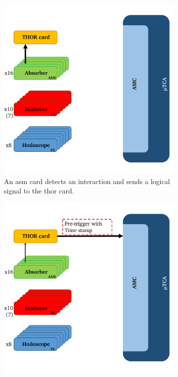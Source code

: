 \begin{figure}
\begin{subfigure}[t]{0.5\textwidth}
 \centering
\includegraphics[width=0.9\linewidth]{03_GraphicFiles/appendixA_dataFormat/triggerLogic_1.pdf}
\caption[Signal detection on one \gls{asm} card and logical signal sent to the \gls{thor} card.]{An \gls{asm} card detects an interaction and sends a logical signal to the \gls{thor} card.}
\label{chapappA::subfig::triggerLogic_1}
\end{subfigure}%
\begin{subfigure}[t]{0.5\textwidth}
 \centering
\includegraphics[width=0.9\linewidth]{03_GraphicFiles/appendixA_dataFormat/triggerLogic_2.pdf}

\end{subfigure}
\end{figure}
